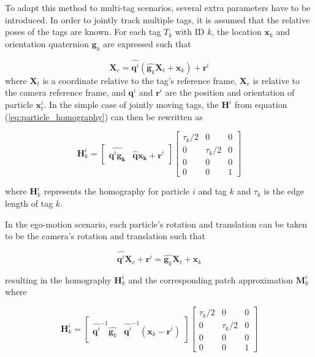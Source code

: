 \documentclass[letterpaper, 10 pt, conference]{ieeeconf}
\renewcommand{\vec}[1]{\boldsymbol{#1}}
\renewcommand{\eqref}[1]{\textup{{\normalfont(\ref{#1}}\normalfont)}}
\begin{document}
To adapt this method to multi-tag scenarios, several extra parameters have to be introduced. In order to jointly track multiple tags, it is assumed that the relative poses of the tags are known. For each tag $T_k$ with ID $k$, the location $\vec{x}_{k}$ and orientation quaternion $\vec{g}_{k}$ are expressed such that

\begin{equation}
	\vec{X}_c = \widehat{\vec{q}^i} (\widehat{\vec{g}_k} \vec{X}_t + \vec{x}_k) + \vec{r}^i
\end{equation}
where $\vec{X}_t$ is a coordinate relative to the tag's reference frame, $\vec{X}_c$ is relative to the camera reference frame, and $\vec{q}^i$ and $\vec{r}^i$ are the position and orientation of particle $\vec{x}^i_t$. In the simple case of jointly moving tags, the $\vec{H}^i$ from equation \eqref{eq:particle_homography} can then be rewritten as


\begin{equation}
	\vec{H}^i_{k} =
	\begin{bmatrix}
		\widehat{\vec{q}^i \vec{g_k}} & \widehat{\vec{q}} \vec{x_k} + \vec{r}^i
	\end{bmatrix}\begin{bmatrix}
		\tau_k/2 & 0 & 0 \\
		0 & \tau_k/2 & 0 \\
		0 & 0 & 0 \\
		0 & 0 & 1
	\end{bmatrix}
\end{equation}

where $\vec{H}^i_k$ represents the homography for particle $i$ and tag $k$ and $\tau_k$ is the edge length of tag $k$.


In the ego-motion scenario, each particle's rotation and translation can be taken to be the camera's rotation and  translation such that

\begin{equation}
	\widehat{\vec{q}^i}\vec{X}_c + \vec{r}^i = \widehat{\vec{g}_k} \vec{X}_t + \vec{x}_k
\end{equation}

resulting in the homography $\vec{H}^i_k$ and the corresponding patch approximation $\vec{M}^i_k$ where

\begin{equation}
	\vec{H}^i_k = \begin{bmatrix}
		\widehat{\vec{q}^i}^{-1} \widehat{\vec{g}_k} & \widehat{\vec{q}^i}^{-1} (\vec{x}_k - \vec{r}^i)
	\end{bmatrix} \begin{bmatrix}
		\tau_k/2 & 0 & 0 \\
		0 & \tau_k/2 & 0 \\
		0 & 0 & 0 \\
		0 & 0 & 1
	\end{bmatrix}
\end{equation}
\end{document}
